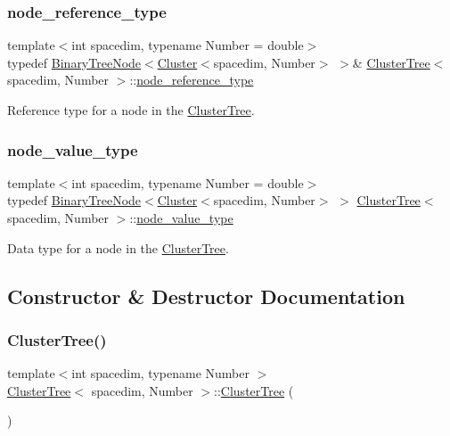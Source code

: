 \subsubsection{\texorpdfstring{node\+\_\+reference\+\_\+type}{node\_reference\_type}}
{\footnotesize\ttfamily template$<$int spacedim, typename Number = double$>$ \\
typedef \hyperlink{classBinaryTreeNode}{Binary\+Tree\+Node}$<$\hyperlink{classCluster}{Cluster}$<$spacedim, Number$>$ $>$\& \hyperlink{classClusterTree}{Cluster\+Tree}$<$ spacedim, Number $>$\+::\hyperlink{classClusterTree_a257ebe4c6eab6581a0b65ba62487ae2c}{node\+\_\+reference\+\_\+type}}

Reference type for a node in the \hyperlink{classClusterTree}{Cluster\+Tree}. \mbox{\label{classClusterTree_ab12442ec2508818e1663df6c5a137b05}} 
\subsubsection{\texorpdfstring{node\+\_\+value\+\_\+type}{node\_value\_type}}
{\footnotesize\ttfamily template$<$int spacedim, typename Number = double$>$ \\
typedef \hyperlink{classBinaryTreeNode}{Binary\+Tree\+Node}$<$\hyperlink{classCluster}{Cluster}$<$spacedim, Number$>$ $>$ \hyperlink{classClusterTree}{Cluster\+Tree}$<$ spacedim, Number $>$\+::\hyperlink{classClusterTree_ab12442ec2508818e1663df6c5a137b05}{node\+\_\+value\+\_\+type}}

Data type for a node in the \hyperlink{classClusterTree}{Cluster\+Tree}. 

\subsection{Constructor \& Destructor Documentation}
\mbox{\label{classClusterTree_a28b31e2fbe58c74eff89a1a8e2124e10}} 
\subsubsection{\texorpdfstring{Cluster\+Tree()}{ClusterTree()}\hspace{0.1cm}{\footnotesize\ttfamily [1/5]}}
{\footnotesize\ttfamily template$<$int spacedim, typename Number $>$ \\
\hyperlink{classClusterTree}{Cluster\+Tree}$<$ spacedim, Number $>$\+::\hyperlink{classClusterTree}{Cluster\+Tree} (\begin{DoxyParamCaption}{ }\end{DoxyParamCaption})}


